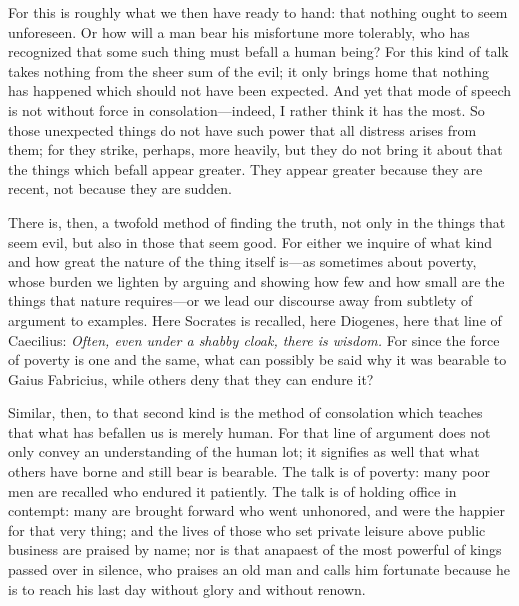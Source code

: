 For this is roughly what we then have ready to hand: that nothing ought to seem unforeseen. Or how will a man bear his misfortune more tolerably, who has recognized that some such thing must befall a human being? For this kind of talk takes nothing from the sheer sum of the evil; it only brings home that nothing has happened which should not have been expected. And yet that mode of speech is not without force in consolation—indeed, I rather think it has the most. So those unexpected things do not have such power that all distress arises from them; for they strike, perhaps, more heavily, but they do not bring it about that the things which befall appear greater. They appear greater because they are recent, not because they are sudden.

 There is, then, a twofold method of finding the truth, not only in the things that seem evil, but also in those that seem good. For either we inquire of what kind and how great the nature of the thing itself is—as sometimes about poverty, whose burden we lighten by arguing and showing how few and how small are the things that nature requires—or we lead our discourse away from subtlety of argument to examples. Here Socrates is recalled, here Diogenes, here that line of Caecilius: \textit{Often, even under a shabby cloak, there is wisdom.} For since the force of poverty is one and the same, what can possibly be said why it was bearable to Gaius Fabricius, while others deny that they can endure it?

 Similar, then, to that second kind is the method of consolation which teaches that what has befallen us is merely human. For that line of argument does not only convey an understanding of the human lot; it signifies as well that what others have borne and still bear is bearable. The talk is of poverty: many poor men are recalled who endured it patiently. The talk is of holding office in contempt: many are brought forward who went unhonored, and were the happier for that very thing; and the lives of those who set private leisure above public business are praised by name; nor is that anapaest of the most powerful of kings passed over in silence, who praises an old man and calls him fortunate because he is to reach his last day without glory and without renown.

